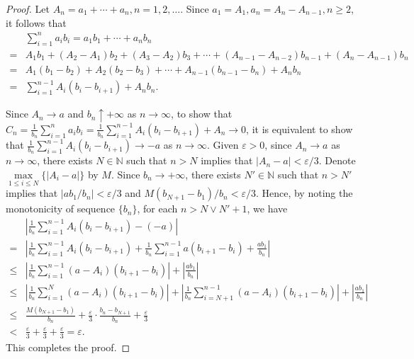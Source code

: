 \documentclass{article}
\newcommand{\eps}{\varepsilon}
\newcommand{\nn}{\mathbb{N}}
\theoremstyle{definition}
\theoremstyle{plain}
\theoremstyle{remark}
\begin{document}
\begin{description}
\begin{description}
\begin{proof}
Let $A_n = a_1 + \cdots + a_n, n = 1, 2, \ldots$. Since $a_1 = A_1, a_n = A_n - A_{n - 1}, n \geq 2$, it follows that
\begin{align*}
& \sum_{i = 1}^n a_ib_i = a_1b_1 + \cdots + a_nb_n \\
= & A_1b_1 + (A_2 - A_1)b_2 + (A_3 - A_2)b_3 + \cdots + (A_{n - 1} - A_{n - 2})b_{n - 1} + (A_n - A_{n - 1})b_n \\
= & A_1(b_1 - b_2) + A_2(b_2 - b_3) + \cdots + A_{n - 1}(b_{n - 1} - b_n) + A_nb_n \\
= & \sum_{i = 1}^{n - 1}A_i(b_i - b_{i + 1}) + A_nb_n.
\end{align*}

Since $A_n \to a$ and $b_n \uparrow +\infty$ as $n \to \infty$, to show that $\displaystyle C_n = \frac{1}{b_n}\sum_{i = 1}^n a_ib_i = \frac{1}{b_n}\sum_{i = 1}^{n - 1}A_i(b_i - b_{i + 1}) + A_n \to 0$, it is equivalent to show that $\displaystyle \frac{1}{b_n}\sum_{i = 1}^{n - 1}A_i(b_i - b_{i + 1}) \to -a$ as $n \to \infty$. Given $\eps > 0$, since $A_n \to a$ as $n \to \infty$, there exists $N \in \nn$ such that $n > N$ implies that $|A_n - a| < \eps/3$. Denote $\max\limits_{1 \leq i \leq N}\{|A_i - a|\}$ by $M$. Since $b_n \to +\infty$, there exists $N' \in \nn$ such that $n > N'$ implies that $|ab_1/b_n| < \eps/3$ and $M(b_{N + 1} - b_1)/b_n < \eps/3$. Hence, by noting the monotonicity of sequence $\{b_n\}$, for each $n > N \vee N' + 1$, we have
\begin{align*}
& \left|\frac{1}{b_n}\sum_{i = 1}^{n - 1} A_i(b_i - b_{i + 1}) - (-a)\right| \\
= & \left|\frac{1}{b_n}\sum_{i = 1}^{n - 1} A_i(b_i - b_{i + 1}) + \frac{1}{b_n}\sum_{i = 1}^{n - 1} a(b_{i + 1} - b_i) + \frac{ab_1}{b_n}\right| \\
\leq & \left|\frac{1}{b_n}\sum_{i = 1}^{n - 1} (a - A_i)(b_{i + 1} - b_i)\right| + \left|\frac{ab_1}{b_n}\right| \\
\leq & \left|\frac{1}{b_n}\sum_{i = 1}^{N} (a - A_i)(b_{i + 1} - b_i)\right| + \left|\frac{1}{b_n}\sum_{i = N + 1}^{n - 1} (a - A_i)(b_{i + 1} - b_i)\right|+ \left|\frac{ab_1}{b_n}\right| \\
\leq & \frac{M(b_{N + 1} - b_1)}{b_n} + \frac{\eps}{3}\cdot\frac{b_n - b_{N + 1}}{b_n} + \frac{\eps}{3} \\
< & \frac{\eps}{3} + \frac{\eps}{3} + \frac{\eps}{3} = \eps.
\end{align*}
This completes the proof.
\end{proof}
\end{description}


\end{description}
\end{document}
